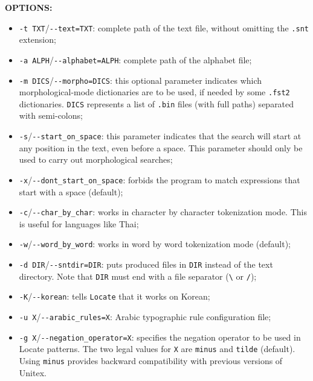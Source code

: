 \bigskip
\noindent \textbf{OPTIONS:}
\begin{itemize}
  \item \verb+-t TXT+/\verb+--text=TXT+: complete path of the text file, without omitting
  the \verb+.snt+ extension;

  \item \verb+-a ALPH+/\verb+--alphabet=ALPH+: complete path of the alphabet
  file;
  
  \item \verb+-m DICS+/\verb+--morpho=DICS+: this optional parameter indicates
  which morphological-mode dictionaries are to be used, if needed by some \verb+.fst2+
  dictionaries. \verb+DICS+ represents a list of \verb+.bin+ files (with full
  paths) separated with semi-colons;
  
  \item \verb+-s+/\verb+--start_on_space+: this parameter indicates that the
  search will start at any position in the text, even before a space. This 
  parameter should only be used to carry out morphological searches;
  
  \item \verb+-x+/\verb+--dont_start_on_space+: forbids the program to match
  expressions that start with a space (default);
  
  \item \verb+-c+/\verb+--char_by_char+: works in character by character
  tokenization mode. This is useful for languages like Thai;
  
  \item \verb+-w+/\verb+--word_by_word+: works in word by word
  tokenization mode (default);
  
  \item \verb+-d DIR+/\verb+--sntdir=DIR+: puts produced files in \verb+DIR+
  instead of the text directory. Note that \verb+DIR+ must end with a file separator
  (\verb+\+ or \verb+/+);
  
  \item \verb+-K+/\verb+--korean+: tells \verb+Locate+ that it works on Korean;

  \item \verb+-u X+/\verb+--arabic_rules=X+: Arabic typographic rule configuration file;

  \item \verb+-g X+/\verb+--negation_operator=X+: specifies the negation operator to be used in
  Locate patterns. The two legal values for \verb+X+ are \verb+minus+ and \verb+tilde+ (default).
  Using \verb+minus+ provides backward compatibility with previous versions of Unitex.
\end{itemize}

